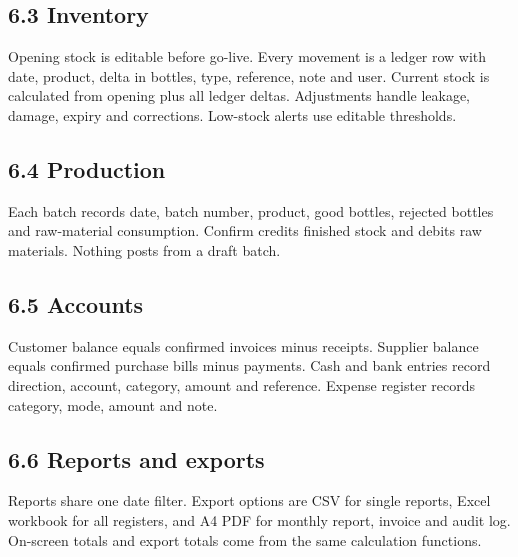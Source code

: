 \documentclass[11pt]{article}
\begin{document}
\subsection{6.3 Inventory}
Opening stock is editable before go-live. Every movement is a ledger row with date, product, delta in bottles, type, reference, note and user. Current stock is calculated from opening plus all ledger deltas. Adjustments handle leakage, damage, expiry and corrections. Low-stock alerts use editable thresholds.
\subsection{6.4 Production}
Each batch records date, batch number, product, good bottles, rejected bottles and raw-material consumption. Confirm credits finished stock and debits raw materials. Nothing posts from a draft batch.
\subsection{6.5 Accounts}
Customer balance equals confirmed invoices minus receipts. Supplier balance equals confirmed purchase bills minus payments. Cash and bank entries record direction, account, category, amount and reference. Expense register records category, mode, amount and note.
\subsection{6.6 Reports and exports}
Reports share one date filter. Export options are CSV for single reports, Excel workbook for all registers, and A4 PDF for monthly report, invoice and audit log. On-screen totals and export totals come from the same calculation functions.
\clearpage
\end{document}
